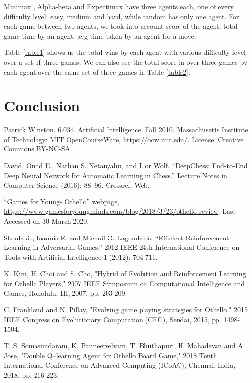 \documentclass{svproc}
\begin{document}
Minimax , Alpha-beta and Expectimax have three agents each, one of every difficulty level: easy, medium and hard, while random has only one agent. For each game between two agents, we took into account score of the agent, total game time by an agent, avg time taken by an agent for a move.

Table \ref{table1} shows us the total wins by each agent with various difficulty level over a set of three games. We can also see the total score in over three games by each agent over the same set of three games in Table \ref{table2}.



\section{Conclusion}\label{5}



\begin{thebibliography}{6}
%

Patrick Winston.  6.034. Artificial Intelligence. Fall 2010. Massachusetts Institute of Technology: MIT OpenCourseWare, \url{https://ocw.mit.edu/}. License: Creative Commons BY-NC-SA.

David, Omid E., Nathan S. Netanyahu, and Lior Wolf. “DeepChess: End-to-End Deep Neural Network for Automatic Learning in Chess.” Lecture Notes in Computer Science (2016): 88–96. Crossref. Web.

“Games for Young- Othello” webpage,
\url{https://www.gamesforyoungminds.com/blog/2018/3/23/othello-review}.
Last Accessed on 30 March 2020.

Skoulakis, Ioannis E. and Michail G. Lagoudakis. “Efficient Reinforcement Learning in Adversarial Games.” 2012 IEEE 24th International Conference on Tools with Artificial Intelligence 1 (2012): 704-711.

K. Kim, H. Choi and S. Cho, "Hybrid of Evolution and Reinforcement Learning for Othello Players," 2007 IEEE Symposium on Computational Intelligence and Games, Honolulu, HI, 2007, pp. 203-209.

C. Frankland and N. Pillay, "Evolving game playing strategies for Othello," 2015 IEEE Congress on Evolutionary Computation (CEC), Sendai, 2015, pp. 1498-1504.

T. S. Somasundaram, K. Panneerselvam, T. Bhuthapuri, H. Mahadevan and A. Jose, "Double Q–learning Agent for Othello Board Game," 2018 Tenth International Conference on Advanced Computing (ICoAC), Chennai, India, 2018, pp. 216-223.

\end{thebibliography}
\end{document}

